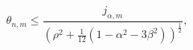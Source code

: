 \[\theta_{n,m}\leq\frac{j_{\alpha,m}}{\left(\rho^{2}+\tfrac{1}{12}\left(1-\alpha%
^{2}-3\beta^{2}\right)\right)^{\frac{1}{2}}},\]